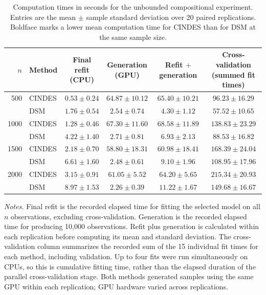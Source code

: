 \begin{table}[htbp]
\centering
\caption{Computation times in seconds for the unbounded compositional experiment. Entries are the mean $\pm$ sample standard deviation over 20 paired replications. Boldface marks a lower mean computation time for CINDES than for DSM at the same sample size.}
\label{tab:cindes_runtime_full}
\small
\setlength{\tabcolsep}{4pt}
\renewcommand{\arraystretch}{1.15}
\begin{tabular}{rlcccc}
\toprule
$n$ & Method & \shortstack{Final refit\\(CPU)} & \shortstack{Generation\\(GPU)} & \shortstack{Refit $+$\\generation} & \shortstack{Cross-validation\\(summed fit times)} \\
\midrule
500 & CINDES & $\boldsymbol{0.53 \pm 0.24}$ & $64.87 \pm 10.12$ & $65.40 \pm 10.21$ & $96.23 \pm 16.29$ \\
 & DSM & $1.76 \pm 0.54$ & $2.54 \pm 0.74$ & $4.30 \pm 1.12$ & $57.52 \pm 10.65$ \\
\midrule
1000 & CINDES & $\boldsymbol{1.28 \pm 0.46}$ & $67.30 \pm 11.60$ & $68.58 \pm 11.89$ & $138.83 \pm 23.29$ \\
 & DSM & $4.22 \pm 1.40$ & $2.71 \pm 0.81$ & $6.93 \pm 2.13$ & $88.53 \pm 16.82$ \\
\midrule
1500 & CINDES & $\boldsymbol{2.18 \pm 0.70}$ & $58.80 \pm 18.31$ & $60.98 \pm 18.41$ & $168.39 \pm 24.04$ \\
 & DSM & $6.61 \pm 1.60$ & $2.48 \pm 0.61$ & $9.10 \pm 1.96$ & $108.95 \pm 17.96$ \\
\midrule
2000 & CINDES & $\boldsymbol{3.15 \pm 0.91}$ & $61.05 \pm 5.52$ & $64.20 \pm 5.65$ & $215.34 \pm 20.93$ \\
 & DSM & $8.97 \pm 1.53$ & $2.26 \pm 0.39$ & $11.22 \pm 1.67$ & $149.68 \pm 16.67$ \\
\bottomrule
\end{tabular}
\par\smallskip
\begin{minipage}{\textwidth}
\footnotesize
\textit{Notes.} Final refit is the recorded elapsed time for fitting the selected model on all $n$ observations, excluding cross-validation. Generation is the recorded elapsed time for producing 10,000 observations. Refit plus generation is calculated within each replication before computing its mean and standard deviation. The cross-validation column summarizes the recorded sum of the 15 individual fit times for each method, including validation. Up to four fits were run simultaneously on CPUs, so this is cumulative fitting time, rather than the elapsed duration of the parallel cross-validation stage. Both methods generated samples using the same GPU within each replication; GPU hardware varied across replications.
\end{minipage}
\end{table}
